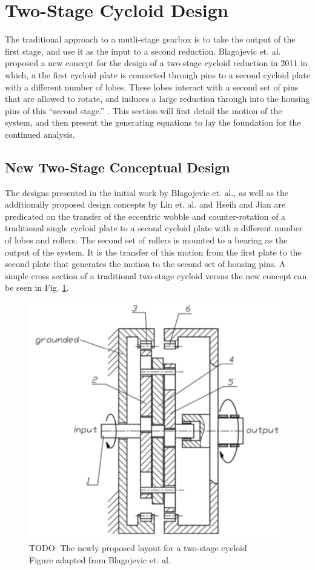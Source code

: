 \section{Two-Stage Cycloid Design} \label{ch:dual:initial_equations}

The traditional approach to a mutli-stage gearbox is to take the output of the first stage, and use it as the input to a second reduction. Blagojevic et. al. proposed a new concept for the design of a two-stage cycloid reduction in 2011 in which, a the first cycloid plate is connected through pins to a second cycloid plate with a different number of lobes. These lobes interact with a second set of pins that are allowed to rotate, and induces a large reduction through into the housing pins of this ``second stage.'' \cite{ref:new_two_stage}. This section will first detail the motion of the system, and then present the generating equations to lay the foundation for the continued analysis. 

\subsection{New Two-Stage Conceptual Design} \label{ch:dual:initial_equation:motion}

The designs presented in the initial work by Blagojevic et. al., as well as the additionally proposed design concepts by Lin et. al. \cite{ref:two_stage_tooth_mod} and Hseih and Jian \cite{ref:hsieh_effect_2016} are predicated on the transfer of the eccentric wobble and counter-rotation of a traditional single cycloid plate to a second cycloid plate with a different number of lobes and rollers. The second set of rollers is mounted to a bearing as the output of the system. It is the transfer of this motion from the first plate to the second plate that generates the motion to the second set of housing pins. A simple cross section of a traditional two-stage cycloid versus the new concept can be seen in Fig. \ref{fig:two_stage_simple_cross}. 

\begin{figure}[h]
	\centering
	\includegraphics[width=0.48\linewidth]{fig/new_layout_TODO}
   \caption{TODO: The newly proposed layout for a two-stage cycloid
   \\ Figure adapted from Blagojevic et. al. \cite{ref:new_two_stage}}
   \label{fig:two_stage_simple_cross}
\end{figure}


